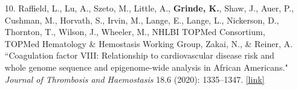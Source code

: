 \documentclass[margin]{res}
\begin{document}
\begin{resume}
\begin{itemize}
\item[10.] Raffield, L., Lu, A., Szeto, M., Little, A., \textbf{Grinde, K.},  Shaw, J., Auer, P., Cushman, M., Horvath, S., Irvin, M., Lange, E., Lange, L., Nickerson, D., Thornton, T., Wilson, J., Wheeler, M., NHLBI TOPMed Consortium, TOPMed Hematology \& Hemostasis Working Group, Zakai, N., \& Reiner, A. ``Coagulation factor VIII: Relationship to cardiovascular disease risk and whole genome sequence and epigenome-wide analysis in African Americans." \textit{Journal of Thrombosis and Haemostasis} 18.6 (2020): 1335--1347.
\href{https://www.sciencedirect.com/science/article/pii/S1538783622014118}{[link]}


\end{itemize}
\end{resume}
\end{document}
